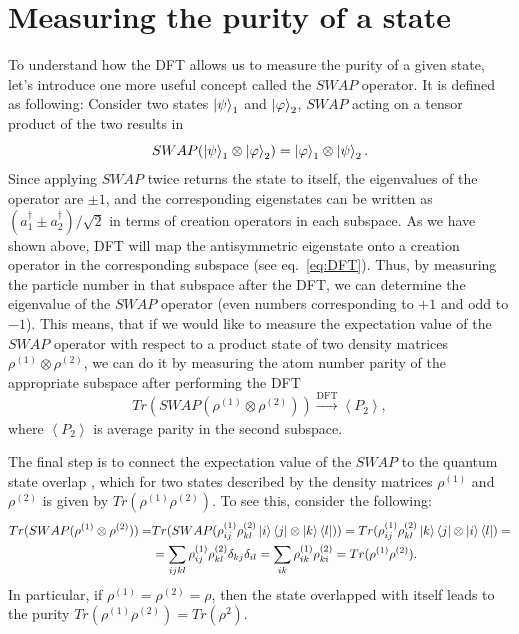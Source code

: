 \section{Measuring the purity of a state}
To understand how the DFT allows us to measure the purity of a given state, let's introduce one more useful concept called the $SWAP$ operator. It is defined as following: Consider two states $\left|\psi\right\rangle_1$ and $\left|\varphi\right\rangle_2$, $SWAP$ acting on a tensor product of the two results in 
\begin{equation}
SWAP(\left|\psi\right\rangle_1 \otimes \left|\varphi\right\rangle_2) = \left|\varphi\right\rangle_1 \otimes \left|\psi\right\rangle_2.
\end{equation}
Since applying $SWAP$ twice returns the state to itself, the eigenvalues of the operator are $\pm 1$, and the corresponding eigenstates can be written as $(a^{\dagger}_1 \pm a^{\dagger}_2)/\sqrt{2}$ in terms of creation operators in each subspace. As we have shown above, DFT will map the antisymmetric eigenstate onto a creation operator in the corresponding subspace (see eq.~\ref{eq:DFT}). Thus, by measuring the particle number in that subspace after the DFT, we can determine the eigenvalue of the $SWAP$ operator (even numbers corresponding to $+1$ and odd to $-1$). This means, that if we would like to measure the expectation value of the $SWAP$ operator with respect to a product state of two density matrices $\rho^{(1)} \otimes \rho^{(2)}$, we can do it by measuring the atom number parity of the appropriate subspace after performing the DFT
\begin{equation}
Tr(SWAP(\rho^{(1)} \otimes \rho^{(2)})) \xrightarrow[]{\text{DFT}} \left< P_2 \right>,
\end{equation}
where $\left< P_2 \right>$ is average parity in the second subspace.

The final step is to connect the expectation value of the $SWAP$ to the quantum state overlap \cite{Ekert2002}, which for two states described by the density matrices $\rho^{(1)}$ and $\rho^{(2)}$ is given by $Tr(\rho^{(1)} \rho^{(2)})$. To see this, consider the following:
\begin{equation}
\begin{aligned}
Tr(SWAP(\rho^{(1)} \otimes \rho^{(2)})) =& Tr(SWAP(\rho^{(1)}_{ij} \rho^{(2)}_{kl} \left|i\right\rangle\left\langle j\right| \otimes \left|k\right\rangle\left\langle l\right|)) =Tr(\rho^{(1)}_{ij} \rho^{(2)}_{kl} \left|k\right\rangle\left\langle j\right| \otimes \left|i\right\rangle\left\langle l\right|) = \\
&=\sum_{ijkl}\rho^{(1)}_{ij} \rho^{(2)}_{kl} \delta_{kj} \delta_{il} = \sum_{ik}\rho^{(1)}_{ik} \rho^{(2)}_{ki} = Tr(\rho^{(1)} \rho^{(2)}).
\end{aligned}
\end{equation}
In particular, if $\rho^{(1)}=\rho^{(2)}=\rho$, then the state overlapped with itself leads to the purity \cite{Alves2004, Daley2012} $Tr(\rho^{(1)} \rho^{(2)}) = Tr(\rho^2)$.

